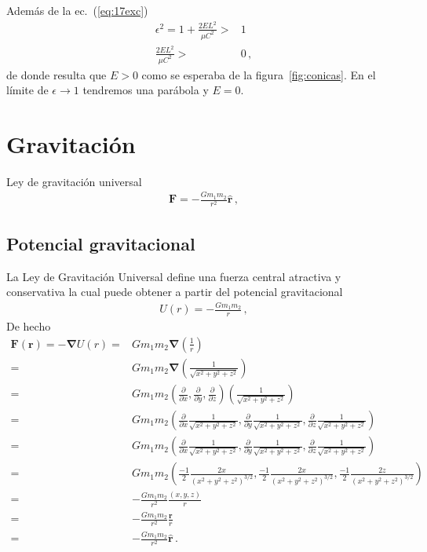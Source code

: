 Además de la ec.~(\ref{eq:17exc})
\begin{align}
  \epsilon^2=1+\frac{2EL^2}{\mu C^2}>&1\nonumber\\
  \frac{2EL^2}{\mu C^2}>&0\,,
\end{align}
de donde resulta que $E>0$ como se esperaba de la figura~\ref{fig:conicas}. En el límite de $\epsilon\to 1$ tendremos una parábola y $E=0$.

 
\section{Gravitación}

Ley de gravitación universal
\begin{align*}
  \mathbf{F}=-\frac{Gm_1m_2}{r^2}\hat{\mathbf{r}}\,,
\end{align*}


\subsection{Potencial gravitacional}
La Ley de Gravitación Universal define una fuerza central atractiva y conservativa la cual puede obtener a partir del potencial gravitacional
\begin{align*}
  U(r)=-\frac{Gm_1m_2}{r}\,,
\end{align*}
De hecho %
\begin{align*}
\mathbf{F}(\mathbf{r})=-\boldsymbol{\nabla}U(r)
=&Gm_1m_2\boldsymbol{\nabla}\left(\frac{1}{r}\right)\nonumber\\
=&Gm_1m_2\boldsymbol{\nabla}\left(\frac{1}{\sqrt{x^2+y^2+z^2}}\right)\nonumber\\
=&Gm_1m_2\left(\frac{\partial}{\partial x},\frac{\partial}{\partial y},\frac{\partial}{\partial z}\right)\left(\frac{1}{\sqrt{x^2+y^2+z^2}}\right)\nonumber\\
=&Gm_1m_2\left(\frac{\partial}{\partial x}\frac{1}{\sqrt{x^2+y^2+z^2}},\frac{\partial}{\partial y}\frac{1}{\sqrt{x^2+y^2+z^2}},\frac{\partial}{\partial z}\frac{1}{\sqrt{x^2+y^2+z^2}}\right)\nonumber\\
=&Gm_1m_2\left(\frac{\partial}{\partial x}\frac{1}{\sqrt{x^2+y^2+z^2}},\frac{\partial}{\partial y}\frac{1}{\sqrt{x^2+y^2+z^2}},\frac{\partial}{\partial z}\frac{1}{\sqrt{x^2+y^2+z^2}}\right)\nonumber\\
=&Gm_1m_2\left(\frac{-1}{2}\frac{2x}{(x^2+y^2+z^2)^{3/2}},\frac{-1}{2}\frac{2x}{(x^2+y^2+z^2)^{3/2}},\frac{-1}{2}\frac{2z}{(x^2+y^2+z^2)^{3/2}}\right)\nonumber\\
=&-\frac{Gm_1m_2}{r^2}\frac{(x,y,z)}{r}\nonumber\\
=&-\frac{Gm_1m_2}{r^2}\frac{\mathbf{r}}{r}\nonumber\\
=&-\frac{Gm_1m_2}{r^2}\hat{\mathbf{r}}\,.
\end{align*}

